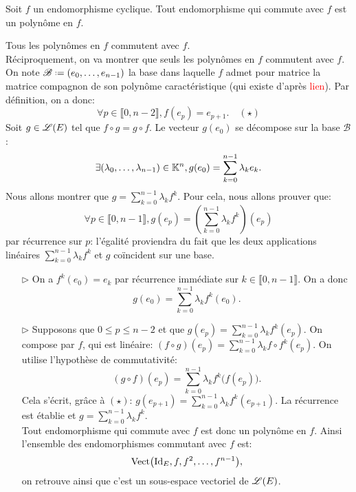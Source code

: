 \begin{prop}{}
    Soit $f$ un endomorphisme cyclique. Tout endomorphisme qui commute avec $f$ est un polynôme en $f$.
\end{prop}

\begin{preuve}
    Tous les polynômes en $f$ commutent avec $f$. \\
    Réciproquement, on va montrer que seuls les polynômes en $f$ commutent avec $f$. On note $\mathscr{B} \defeq (e_0, \dots, e_{n-1})$ la base dans laquelle $f$ admet pour matrice la matrice compagnon de son polynôme caractéristique (qui existe d'après \textcolor{red}{lien}). Par définition, on a donc:
    $$\forall p \in \llbracket 0, n-2 \rrbracket, f(e_p) = e_{p+1}. \quad (\star)$$
    Soit $g \in \mathscr{L}(E)$ tel que $f \circ g = g \circ f$. Le vecteur $g(e_0)$ se décompose sur la base $\mathscr{B}$:
    $$\exists (\lambda_0, \dots, \lambda_{n-1}) \in \mathbb{K}^n, g(e_0) = \sum_{k=0}^{n-1} \lambda_k e_k.$$
    Nous allons montrer que $g = \sum\limits_{k=0}^{n-1} \lambda_k f^k$. Pour cela, nous allons prouver que:
    $$\forall p \in \llbracket 0, n-1 \rrbracket, g(e_p) = \left( \sum_{k=0}^{n-1} \lambda_k f^k \right)(e_p)$$
    par récurrence sur $p$: l'égalité proviendra du fait que les deux applications linéaires $\sum\limits_{k=0}^{n-1} \lambda_k f^k$ et $g$ coïncident sur une base. 
    \begin{itemize}
        \item[$\rhd$] On a $f^k (e_0) = e_k$ par récurrence immédiate sur $k \in \llbracket 0, n-1 \rrbracket$. On a donc
        $$g(e_0) = \sum_{k=0}^{n-1} \lambda_k f^k(e_0).$$
        \item[$\rhd$] Supposons que $0 \leqslant p \leqslant n-2$ et que $g(e_p) = \sum\limits_{k=0}^{n-1} \lambda_k f^k (e_p)$. On compose par $f$, qui est linéaire: $(f \circ g)(e_p) = \sum\limits_{k=0}^{n-1} \lambda_k f \circ f^k (e_p)$. On utilise l'hypothèse de commutativité:
        $$(g \circ f)(e_p) = \sum_{k=0}^{n-1} \lambda_k f^k \big( f(e_p) \big).$$
        Cela s'écrit, grâce à $(\star)$: $g(e_{p+1}) = \sum\limits_{k=0}^{n-1} \lambda_k f^k(e_{p+1})$. La récurrence est établie et $g = \sum\limits_{k=0}^{n-1} \lambda_k f^k$. \\
        Tout endomorphisme qui commute avec $f$ est donc un polynôme en $f$. Ainsi l'ensemble des endomorphismes commutant avec $f$ est:
        $$\mathrm{Vect} \big( \mathrm{Id}_E, f, f^2, \dots, f^{n-1}\big),$$
        on retrouve ainsi que c'est un sous-espace vectoriel de $\mathscr{L}(E)$.
    \end{itemize}
\end{preuve}

